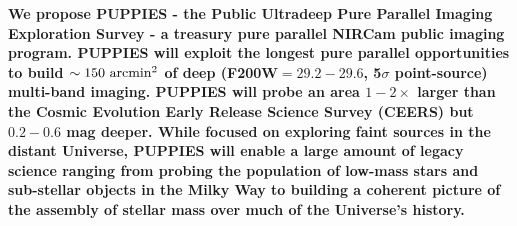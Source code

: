 \documentclass[12pt]{article}
\begin{document}
%
%

\clearpage

\justification          %

\textbf{We propose PUPPIES - the Public Ultradeep Pure Parallel Imaging Exploration Survey - a treasury pure parallel NIRCam public imaging program. PUPPIES will exploit the longest pure parallel opportunities to build $\sim 150\ {\rm arcmin^2}$ of deep (F200W$=29.2-29.6$, 5$\sigma$ point-source) multi-band imaging. PUPPIES will probe an area $1-2\times$ larger than the Cosmic Evolution Early Release Science Survey (CEERS) but $0.2-0.6$ mag deeper. While focused on exploring faint sources in the distant Universe, PUPPIES will enable a large amount of legacy science ranging from probing the population of low-mass stars and sub-stellar objects in the Milky Way to building a coherent picture of the assembly of stellar mass over much of the Universe's history.} 




\end{document}
